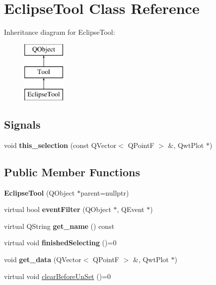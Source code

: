 \hypertarget{classEclipseTool}{}\section{Eclipse\+Tool Class Reference}
\label{classEclipseTool}
Inheritance diagram for Eclipse\+Tool\+:\begin{figure}[H]
\begin{center}
\leavevmode
\includegraphics[height=3.000000cm]{classEclipseTool}
\end{center}
\end{figure}
\subsection*{Signals}
\begin{DoxyCompactItemize}
\item 
\mbox{\label{classTool_a68dea3e4c911f3174176084d350865cc}} 
void {\bfseries this\+\_\+selection} (const Q\+Vector$<$ Q\+PointF $>$ \&, Qwt\+Plot $\ast$)
\end{DoxyCompactItemize}
\subsection*{Public Member Functions}
\begin{DoxyCompactItemize}
\item 
\mbox{\label{classEclipseTool_abc2b8f954c0c83f31b37b759f07f7f40}} 
{\bfseries Eclipse\+Tool} (Q\+Object $\ast$parent=nullptr)
\item 
\mbox{\label{classTool_a020bd5757a03ea7321848a3874f3a8cb}} 
virtual bool {\bfseries event\+Filter} (Q\+Object $\ast$, Q\+Event $\ast$)
\item 
\mbox{\label{classTool_aa30c64915020a71d0ea8650e8e966336}} 
virtual Q\+String {\bfseries get\+\_\+name} () const
\item 
\mbox{\label{classTool_a5cb18e4c28ab3d8d39535db5d2213c81}} 
virtual void {\bfseries finished\+Selecting} ()=0
\item 
\mbox{\label{classTool_a507adfcdafc818d9628b952001b93f3c}} 
void {\bfseries get\+\_\+data} (Q\+Vector$<$ Q\+PointF $>$ \&, Qwt\+Plot $\ast$)
\item 
virtual void \mbox{\hyperlink{classTool_a7d9e7d03f4a34d71850cbbfc16ca8532}{clear\+Before\+Un\+Set}} ()=0
\end{DoxyCompactItemize}

